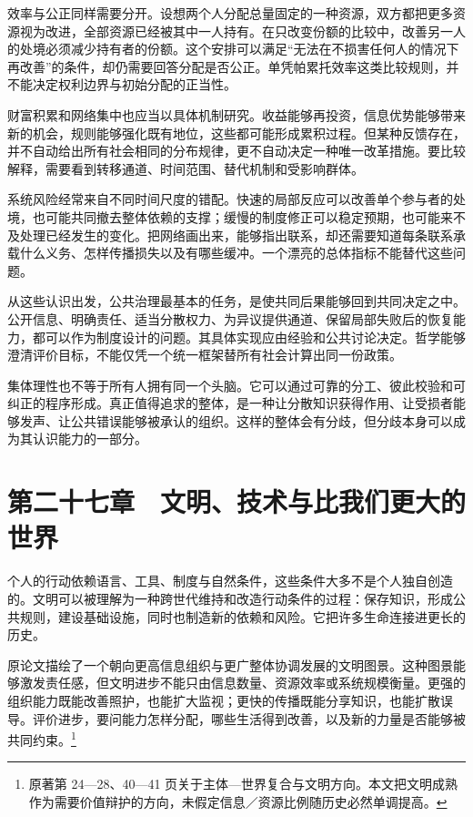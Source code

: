 \documentclass[
  11pt,
  oneside]{book}
\begin{document}
效率与公正同样需要分开。设想两个人分配总量固定的一种资源，双方都把更多资源视为改进，全部资源已经被其中一人持有。在只改变份额的比较中，改善另一人的处境必须减少持有者的份额。这个安排可以满足``无法在不损害任何人的情况下再改善''的条件，却仍需要回答分配是否公正。单凭帕累托效率这类比较规则，并不能决定权利边界与初始分配的正当性。

财富积累和网络集中也应当以具体机制研究。收益能够再投资，信息优势能够带来新的机会，规则能够强化既有地位，这些都可能形成累积过程。但某种反馈存在，并不自动给出所有社会相同的分布规律，更不自动决定一种唯一改革措施。要比较解释，需要看到转移通道、时间范围、替代机制和受影响群体。

系统风险经常来自不同时间尺度的错配。快速的局部反应可以改善单个参与者的处境，也可能共同撤去整体依赖的支撑；缓慢的制度修正可以稳定预期，也可能来不及处理已经发生的变化。把网络画出来，能够指出联系，却还需要知道每条联系承载什么义务、怎样传播损失以及有哪些缓冲。一个漂亮的总体指标不能替代这些问题。

从这些认识出发，公共治理最基本的任务，是使共同后果能够回到共同决定之中。公开信息、明确责任、适当分散权力、为异议提供通道、保留局部失败后的恢复能力，都可以作为制度设计的问题。其具体实现应由经验和公共讨论决定。哲学能够澄清评价目标，不能仅凭一个统一框架替所有社会计算出同一份政策。

\begingroup{}

集体理性也不等于所有人拥有同一个头脑。它可以通过可靠的分工、彼此校验和可纠正的程序形成。真正值得追求的整体，是一种让分散知识获得作用、让受损者能够发声、让公共错误能够被承认的组织。这样的整体会有分歧，但分歧本身可以成为其认识能力的一部分。

\par\endgroup

\chapter{第二十七章　文明、技术与比我们更大的世界}\label{ph-ch-27}

个人的行动依赖语言、工具、制度与自然条件，这些条件大多不是个人独自创造的。文明可以被理解为一种跨世代维持和改造行动条件的过程：保存知识，形成公共规则，建设基础设施，同时也制造新的依赖和风险。它把许多生命连接进更长的历史。

原论文描绘了一个朝向更高信息组织与更广整体协调发展的文明图景。这种图景能够激发责任感，但文明进步不能只由信息数量、资源效率或系统规模衡量。更强的组织能力既能改善照护，也能扩大监视；更快的传播既能分享知识，也能扩散误导。评价进步，要问能力怎样分配，哪些生活得到改善，以及新的力量是否能够被共同约束。\footnote{\hypertarget{ph-note-62}{}原著第 24---28、40---41 页关于主体---世界复合与文明方向。本文把文明成熟作为需要价值辩护的方向，未假定信息／资源比例随历史必然单调提高。}
\end{document}
